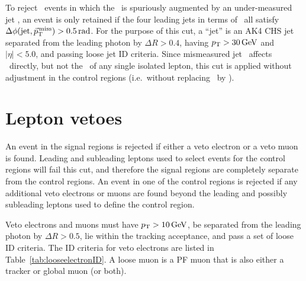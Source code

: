 To reject \gjets\ events in which the \MET\ is spuriously augmented by an under-measured jet \pT,
an event is only retained if the four leading jets in terms of \pT\ all satisfy $\Delta\phi(\mathrm{jet},\vecMET) > 0.5\unit{rad}$.
For the purpose of this cut, a ``jet'' is an AK4 CHS jet separated from the leading photon by $\Delta R > 0.4$, having $\pT > 30\unit{GeV}$ and
$|\eta| < 5.0$, and passing loose jet ID criteria. Since mismeasured jet \vecpT\ affects \vecMET\ directly, but not the \vecpT\ of any single
isolated lepton, this cut is applied without adjustment in the control regions (i.e.\ without replacing \vecMET\ by \vecrecoil).

\section{Lepton vetoes} \label{sec:event_selection_lepveto}
An event in the signal regions is rejected if either a veto electron or a veto muon is found. Leading and subleading leptons used
to select events for the control regions will fail this cut, and therefore the signal regions are completely separate from the control regions.
An event in one of the control regions is rejected if any additional veto electrons or muons are found beyond the leading and possibly subleading
leptons used to define the control region.

Veto electrons and muons must have $\pT > 10\unit{GeV}$, be separated from the leading photon by $\Delta R > 0.5$, lie within the tracking acceptance,
and pass a set of loose ID criteria. The ID criteria for veto electrons are listed in Table~\ref{tab:looseelectronID}.
A loose muon is a PF muon that is also either a tracker or global muon (or both).

